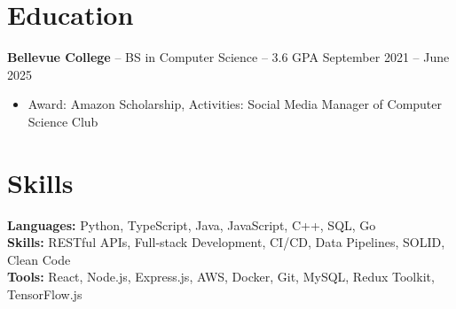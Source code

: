 \documentclass[11pt]{article}       %
\begin{document}

\vspace{-18.5pt}

\section*{Education}
\textbf{Bellevue College} -- BS in Computer Science -- 3.6 GPA \hfill September 2021 -- June 2025\\
\vspace{-9pt}
\begin{itemize}
  \item Award: Amazon Scholarship, Activities: Social Media Manager of Computer Science Club
\end{itemize}

\vspace{-18.5pt}

\section*{Skills}
\textbf{Languages:} Python, TypeScript, Java, JavaScript, C++, SQL, Go\\
\textbf{Skills:} RESTful APIs, Full-stack Development, CI/CD, Data Pipelines, SOLID, Clean Code\\
\textbf{Tools:} React, Node.js, Express.js, AWS, Docker, Git, MySQL, Redux Toolkit, TensorFlow.js\\

\vspace{-6.5pt}
\end{document}
